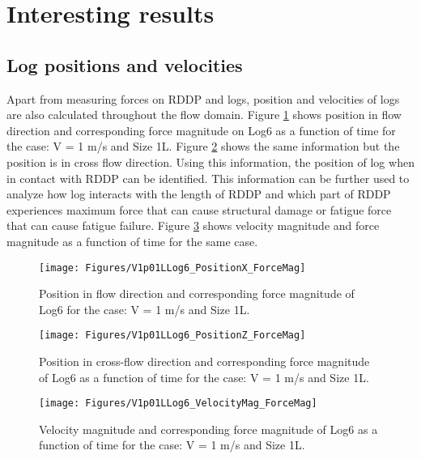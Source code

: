 \FloatBarrier
\section{Interesting results}
\FloatBarrier
\subsection{Log positions and velocities}
Apart from measuring forces on RDDP and logs, position and velocities of logs are also calculated throughout the flow domain. Figure \ref{fig:V1p01LLog6_PositionX_ForceMag} shows position in flow direction and corresponding force magnitude on Log6 as a function of time for the case: V = 1 m/s and Size 1L. Figure \ref{fig:V1p01LLog6_PositionZ_ForceMag} shows the same information but the position is in cross flow direction. Using this information, the position of log when in contact with RDDP can be identified. This information can be further used to analyze how log interacts with the length of RDDP and which part of RDDP experiences maximum force that can cause structural damage or fatigue force that can cause fatigue failure. Figure \ref{fig:V1p01LLog6_VelocityMag_ForceMag} shows velocity magnitude and force magnitude as a function of time for the same case. 

\begin{figure}
\centering
\texttt{[image: Figures/V1p01LLog6\_PositionX\_ForceMag]}
\caption{\label{fig:V1p01LLog6_PositionX_ForceMag}Position in flow direction and corresponding force magnitude of Log6 for the case: V = 1 m/s and Size 1L.}
\end{figure}
\begin{figure}
\centering
\texttt{[image: Figures/V1p01LLog6\_PositionZ\_ForceMag]}
\caption{\label{fig:V1p01LLog6_PositionZ_ForceMag}Position in cross-flow direction and corresponding force magnitude of Log6 as a function of time for the case: V = 1 m/s and Size 1L.}
\end{figure}
\begin{figure}
\centering
\texttt{[image: Figures/V1p01LLog6\_VelocityMag\_ForceMag]}
\caption{\label{fig:V1p01LLog6_VelocityMag_ForceMag}Velocity magnitude and corresponding force magnitude of Log6 as a function of time for the case: V = 1 m/s and Size 1L.}
\end{figure}

\FloatBarrier
